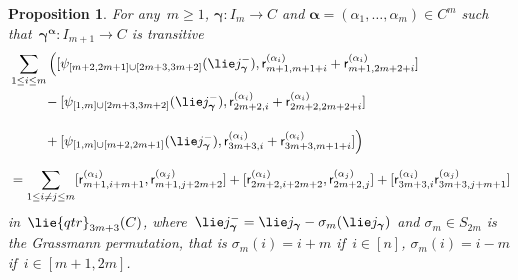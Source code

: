 \documentclass[12pt, reqno]{amsart}
\newtheorem{proposition}[theorem]{Proposition}
\theoremstyle{definition}
\numberwithin{equation}{section}
\newcommand{\sr}[3]{\mathsf r_{#1,#2}^{(#3)}}
\begin{document}
\begin{proposition}\label{prop:identity jc}
For any~$m\ge 1$, $\boldsymbol\gamma:I_m\to C$ and $\boldsymbol\alpha=(\alpha_1,\dots,\alpha_m)\in C^m$ such that~$\boldsymbol\gamma^{\boldsymbol{\alpha}}:I_{m+1}\to C$ is transitive
\begin{align}
&\sum_{1\le i\le m}\Big([\psi_{[m+2,2m+1]\cup[2m+3,3m+2]}(\lie j_{\boldsymbol\gamma}^-),
\sr{m+1}{m+1+i}{\alpha_{i}}+\sr{m+1}{2m+2+i}{\alpha_{i}}]\nonumber\\
&\phantom{\sum_{1\le i\le m}}-[\psi_{[1,m]\cup[2m+3,3m+2]}(\lie j_{\boldsymbol\gamma}^-),
\sr{2m+2}{i}{\alpha_{i}}+\sr{2m+2}{2m+2+i}{\alpha_{i}}]\nonumber\\
&\phantom{\sum_{1\le i\le m}}+[\psi_{[1,m]\cup[m+2,2m+1]}(\lie j_{\boldsymbol\gamma}^-),
\sr{3m+3}{i}{\alpha_{i}}+\sr{3m+3}{m+1+i}{\alpha_{i}}]\Big)\nonumber\\
&=\sum_{1\le i\not=j\le m} [\sr{m+1}{i+m+1}{\alpha_{i}},\sr{m+1}{j+2m+2}{\alpha_{j}}]+[\sr{2m+2}{i+2m+2}{\alpha_{i}},\sr{2m+2}{j}{\alpha_{j}}]+[\sr{3m+3}{i}{\alpha_{i}}
\sr{3m+3}{j+m+1}{\alpha_{j}}]\label{eq:key id jc}
\end{align}
in~$\lie{qtr}_{3m+3}(C)$, 
where~$\lie j^-_{\boldsymbol\gamma}=\lie j_{\boldsymbol\gamma}-\sigma_m(\lie j_{\boldsymbol\gamma})$ and
$\sigma_m\in S_{2m}$ is the Grassmann permutation, that is $\sigma_m(i)=i+m$ if~$i\in[n]$, $\sigma_m(i)=i-m$ if~$i\in[m+1,2m]$.
\end{proposition}
\end{document}
